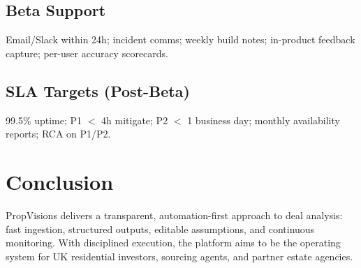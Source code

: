 \documentclass[12pt,a4paper]{article}
\begin{document}
\subsection{Beta Support}
Email/Slack within 24h; incident comms; weekly build notes; in-product feedback capture; per-user accuracy scorecards.

\subsection{SLA Targets (Post-Beta)}
99.5\% uptime; P1 $<$ 4h mitigate; P2 $<$ 1 business day; monthly availability reports; RCA on P1/P2.

\section{Conclusion}
PropVisions delivers a transparent, automation-first approach to deal analysis: fast ingestion, structured outputs, editable assumptions, and continuous monitoring. With disciplined execution, the platform aims to be the operating system for UK residential investors, sourcing agents, and partner estate agencies.

\appendix
\end{document}

